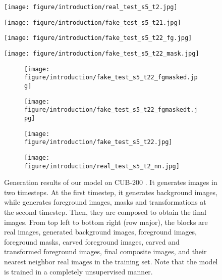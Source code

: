 \documentclass{article} \usepackage{iclr2017_conference,times}
\begin{document}
\begin{figure}[t]
\begin{minipage}{0.245\linewidth}
\center
\texttt{[image: figure/introduction/real\_test\_s5\_t2.jpg]}
\vspace{-0.3cm}
\end{minipage}
\begin{minipage}{0.245\linewidth}
\center
\texttt{[image: figure/introduction/fake\_test\_s5\_t21.jpg]}
\vspace{-0.3cm}
\end{minipage}
\begin{minipage}{0.245\linewidth}
\center
\texttt{[image: figure/introduction/fake\_test\_s5\_t22\_fg.jpg]}
\vspace{-0.3cm}
\end{minipage}
\begin{minipage}{0.245\linewidth}
\center
\texttt{[image: figure/introduction/fake\_test\_s5\_t22\_mask.jpg]}
\vspace{-0.3cm}
\end{minipage}
\begin{subfigure}{0.245\linewidth}
\center
\texttt{[image: figure/introduction/fake\_test\_s5\_t22\_fgmasked.jpg]}
\end{subfigure}
\begin{subfigure}{0.245\linewidth}
\center
\texttt{[image: figure/introduction/fake\_test\_s5\_t22\_fgmaskedt.jpg]}
\end{subfigure}
\begin{subfigure}{0.245\linewidth}
\center
\texttt{[image: figure/introduction/fake\_test\_s5\_t22.jpg]}
\end{subfigure}
\begin{subfigure}{0.245\linewidth}
\center
\texttt{[image: figure/introduction/real\_test\_s5\_t2\_nn.jpg]}
\end{subfigure}
\caption{Generation results of our model on CUB-200 \citep{CUB200}. It generates images in two timesteps. At the first timestep, it generates background images, while generates foreground images, masks and transformations at the second timestep. Then, they are composed to obtain the final images. From top left to bottom right (row major), the blocks are real images, generated background images, foreground images, foreground masks, carved foreground images, carved and transformed foreground images, final composite images, and their nearest neighbor real images in the training set. Note that the model is trained in a completely unsupervised manner.}
\label{Fig_Intro_CUB200}
\end{figure}
\end{document}
